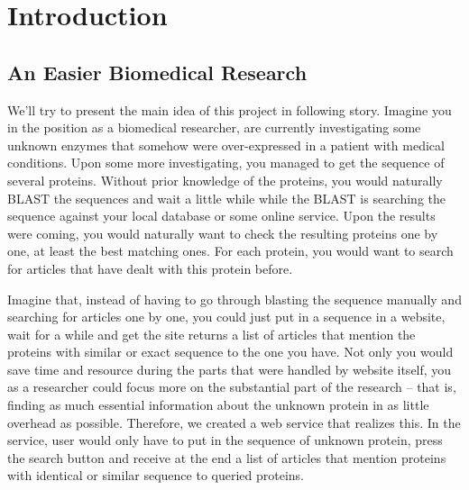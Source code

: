 
\chapter{Introduction} %

\label{Chapter1} %



\section{An Easier Biomedical Research}

We'll try to present the main idea of this project in following story. Imagine you in the position as a biomedical researcher, are currently investigating some unknown enzymes that somehow were over-expressed in a patient with medical conditions. Upon some more investigating, you managed to get the sequence of several proteins. Without prior knowledge of the proteins, you would naturally BLAST the sequences and wait a little while while the BLAST is searching the sequence against your local database or some online service. Upon the results were coming, you would naturally want to check the resulting proteins one by one, at least the best matching ones. For each protein, you would want to search for articles that have dealt with this protein before.

Imagine that, instead of having to go through blasting the sequence manually and searching for articles one by one, you could just put in a sequence in a website, wait for a while and get the site returns a list of articles that mention the proteins with similar or exact sequence to the one you have. Not only you would save time and resource during the parts that were handled by website itself, you as a researcher could focus more on the substantial part of the research -- that is, finding as much essential information about the unknown protein in as little overhead as possible. Therefore, we created a web service that realizes this. In the service, user would only have to put in the sequence of unknown protein, press the search button and receive at the end a list of articles that mention proteins with identical or similar sequence to queried proteins.

